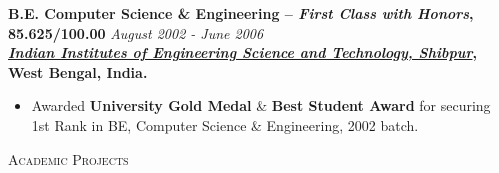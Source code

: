 \documentclass[9pt]{article}
\newenvironment{changemargin}[2]{%
  \begin{list}{}{%
    \setlength{\topsep}{0pt}%
    \setlength{\leftmargin}{#1}%
    \setlength{\rightmargin}{#2}%
    \setlength{\listparindent}{\parindent}%
    \setlength{\itemindent}{\parindent}%
    \setlength{\parsep}{\parskip}%
  }%
  \item[]}{\end{list}
}
\newcommand{\lineover}{
	\begin{changemargin}{-0.05in}{-0.05in}
		\vspace*{-8pt}
		\hrulefill \\
		\vspace*{-2pt}
	\end{changemargin}
}
\newcommand{\header}[1]{
	\begin{changemargin}{-0.5in}{-0.5in}
		\scshape{#1}\\
  	\lineover
	\end{changemargin}
}
\newenvironment{body} {
	\vspace*{-16pt}
	\begin{changemargin}{-0.25in}{-0.5in}
  }	
	{\end{changemargin}
}
\begin{document}
\begin{body}
  \medskip
	\textbf{B.E. Computer Science \& Engineering -- \emph{First Class with Honors}, 85.625/100.00} \hfill \emph{August 2002 - June 2006} \\
	\textbf{\emph{\href{http://www.iiests.ac.in/}{Indian Institutes of Engineering Science and Technology, Shibpur}}, West Bengal, India.}\\
	\begin{itemize} \itemsep -0pt
		\item Awarded \textbf{University Gold Medal} \& \textbf{Best Student Award} for securing 1st Rank in BE, Computer Science \& Engineering, 2002 batch.
	\end{itemize}
\end{body}

\smallskip

\header{Academic Projects}
\end{document}
